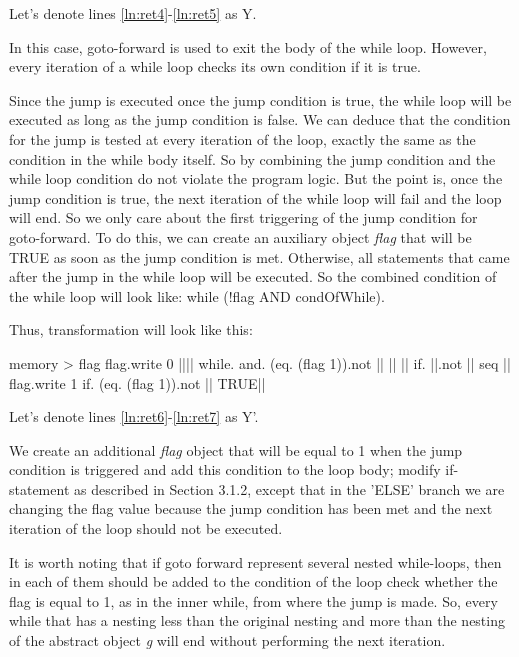 \documentclass[sigplan,review,11pt,nonacm,natbib=false]{acmart}
\begin{document}
Let's denote lines \ref{ln:ret4}-\ref{ln:ret5} as Y.

In this case, goto-forward is used to exit the body of the while loop. However, every iteration of a while loop checks its own condition if it is true. 

Since the jump is executed once the jump condition is true, the while loop will be executed as long as the jump condition is false. We can deduce that the condition for the jump is tested at every iteration of the loop, exactly the same as the condition in the while body itself.
So by combining the jump condition and the while loop condition do not violate the program logic. But the point is, once the jump condition is true, the next iteration of the while loop will fail and the loop will end.
So we only care about the first triggering of the jump condition for goto-forward. To do this, we can create an auxiliary object \emph{flag} that will be TRUE as soon as the jump condition is met.
Otherwise, all statements that came after the jump in the while loop will be executed.
So the combined condition of the while loop will look like: while (!flag AND condOfWhile).

Thus, transformation will look like this:
\begin{ffcode}
memory > flag
flag.write 0
|||$\label{ln:ret6}$|
  while.
    and.
      (eq. (flag 1)).not
      ||
    ||
      ||
      if.
        ||.not
        ||
        seq
          ||
          flag.write 1
      if.
        (eq. (flag 1)).not
        ||
        TRUE|$\label{ln:ret7}$|
\end{ffcode}

Let's denote lines \ref{ln:ret6}-\ref{ln:ret7} as Y'.

We create an additional \emph{flag} object that will be equal to 1 when the jump condition is triggered and add this condition to the loop body; modify if-statement as described in Section 3.1.2, except that in the 'ELSE' branch we are changing the flag value because the jump condition has been met and the next iteration of the loop should not be executed.

It is worth noting that if goto forward represent several nested while-loops, then in each of them should be added to the condition of the loop check whether the flag is equal to 1, as in the inner while, from where the jump is made. So, every while that has a nesting less than the original nesting and more than the nesting of the abstract object \emph{g} will end without performing the next iteration.
\end{document}
